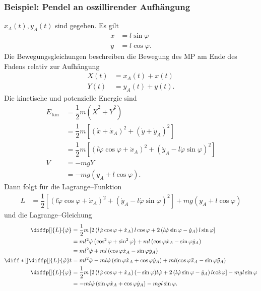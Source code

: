 \documentclass[a4paper,12pt]{article}
\numberwithin{equation}{section}
\begin{document}
\subsubsection{Beispiel: Pendel an oszillirender Aufhängung}
$x_A(t),y_A(t)$ sind gegeben. Es gilt
\begin{align*}
        x&=l \sin \varphi \\
        y&=l \cos \varphi 
.\end{align*}
Die Bewegungsgleichungen beschreiben die Bewegung des MP am Ende des Fadens relativ zur Aufhängung
\begin{align*}
        X(t)&=x_A(t)+x(t)\\
        Y(t)&=y_A(t)+y(t)
.\end{align*}
Die kinetische und potenzielle Energie sind
\begin{align*}
        E_{\,\text{kin}\,}&=\dfrac{1}{2}m\left(\dot{X}^2+\dot{Y}^2\right)\\
                          &=\dfrac{1}{2}m\left[\left(\dot{x}+\dot{x}_A\right)^2+\left(\dot{y}+\dot{y}_A\right)^2\right]\\
                          &=\dfrac{1}{2}m\left[\left(l\dot{\varphi }\cos \varphi +\dot{x}_A\right)^2+\left(\dot{y}_A-l\dot{\varphi }\sin \varphi \right)^2\right]\\
        V&=-mgY\\
         &=-mg\left(y_A+l\cos \varphi \right)
.\end{align*}
Dann folgt für die Lagrange--Funktion
\begin{align*}
        L&=\dfrac{1}{2}\left[\left(l\dot{\varphi }\cos \varphi +\dot{x}_A\right)^2+\left(\dot{y}_A-l\dot{\varphi }\sin \varphi \right)^2\right]+mg\left(y_A+l\cos \varphi \right)
\end{align*}
und die Lagrange--Gleichung
\begin{align*}
        \diffp[]{L}{\dot{\varphi }}&=\dfrac{1}{2}m\left[2\left(l\dot{\varphi }\cos \varphi +\dot{x}_A\right)l\cos \varphi +2\left(l\dot{\varphi }\sin \varphi -\dot{y}_A\right)l \sin \varphi  \right]\\
                                   &=ml^2\dot{\varphi }\left(\cos ^2\varphi +\sin ^2\varphi \right)+ml \left(\cos \varphi \dot{x}_A-\sin \varphi \dot{y}_A\right)\\
                                   &=ml^2\dot{\varphi }+ml\left(\cos \varphi \dot{x}_A-\sin \varphi \dot{y}_A\right)\\
        \diff*[]{\diffp[]{L}{\dot{\varphi }} }{t}&=ml^2\ddot{\varphi }-ml\dot{\varphi }\left(\sin \varphi \dot{x}_A+\cos \varphi \dot{y}_A\right)+ml(\cos \varphi \ddot{x}_A-\sin \varphi \ddot{y}_A)\\
        \diffp[]{L}{\varphi }&=\dfrac{1}{2}m\left[2\left(l\dot{\varphi }\cos \varphi +\dot{x}_A\right)(-\sin \varphi )l\dot{\varphi }+2\left(l\dot{\varphi }\sin \varphi -\dot{y}_A\right)l\dot{\cos \varphi }\right]-mgl \sin \varphi \\
                             &=-ml\dot{\varphi }\left(\sin \varphi \dot{x}_A+\cos \varphi \dot{y}_A\right)-mgl \sin \varphi 
.\end{align*}
\end{document}
